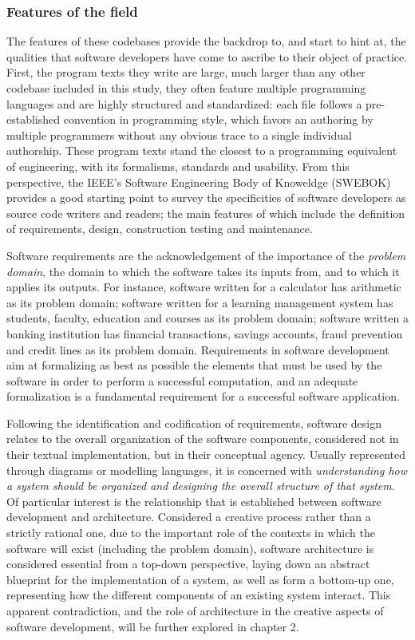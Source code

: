 \subsubsection{Features of the field}

The features of these codebases provide the backdrop to, and start to hint at, the qualities that software developers have come to ascribe to their object of practice. First, the program texts they write are large, much larger than any other codebase included in this study, they often feature multiple programming languages and are highly structured and standardized: each file follows a pre-established convention in programming style, which favors an authoring by multiple programmers without any obvious trace to a single individual authorship. These program texts stand the closest to a programming equivalent of engineering, with its formalisms, standards and usability. From this perspective, the IEEE's Software Engineering Body of Knoweldge (SWEBOK) provides a good starting point to survey the specificities of software developers as source code writers and readers\cite{bourque_swebok_2014}; the main features of which include the definition of requirements, design, construction testing and maintenance.

Software requirements are the acknowledgement of the importance of the \emph{problem domain}, the domain to which the software takes its inputs from, and to which it applies its outputs. For instance, software written for a calculator has arithmetic as its problem domain; software written for a learning management system has students, faculty, education and courses as its problem domain; software written a banking institution has financial transactions, savings accounts, fraud prevention and credit lines as its problem domain. Requirements in software development aim at formalizing as best as possible the elements that must be used by the software in order to perform a successful computation, and an adequate formalization is a fundamental requirement for a successful software application.

Following the identification and codification of requirements, software design relates to the overall organization of the software components, considered not in their textual implementation, but in their conceptual agency. Usually represented through diagrams or modelling languages, it is concerned with \emph{understanding how a system should be
organized and designing the overall structure of that system}\cite{sommerville_software_2010}. Of particular interest is the relationship that is established between software development and architecture. Considered a creative process rather than a strictly rational one, due to the important role of the contexts in which the software will exist (including the problem domain)\cite{sommerville_software_2010}, software architecture is considered essential from a top-down perspective, laying down an abstract blueprint for the implementation of a system, as well as form a bottom-up one, representing how the different components of an existing system interact. This apparent contradiction, and the role of architecture in the creative aspects of software development, will be further explored in chapter 2.

